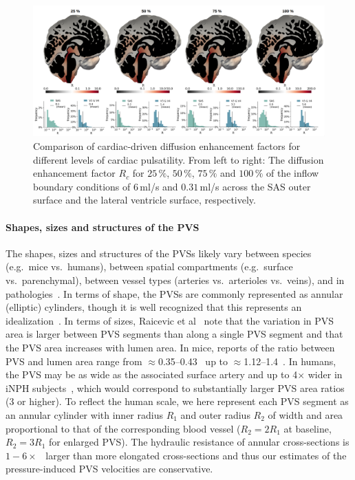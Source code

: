 \documentclass[fleqn,10pt]{wlscirep}
\begin{document}
\begin{figure}
    \centering
    \includegraphics[width=1.0\linewidth]{figures/cardiac_R_comparison.png}
    \caption{Comparison of cardiac-driven diffusion enhancement factors for different levels of cardiac pulsatility. From left to right: The diffusion enhancement factor $R_c$ for $25\,\%$, $50\,\%$, $75\,\%$ and $100\,\%$ of the inflow boundary conditions of $6\,$ml/s and $0.31\,$ml/s across the SAS outer surface and the lateral ventricle surface, respectively.}
    \label{fig:R_comparison}
\end{figure}

\paragraph{Shapes, sizes and structures of the PVS}
The shapes, sizes and structures of the PVSs likely vary between
species (e.g.~mice vs.~humans), between spatial compartments
(e.g.~surface vs.~parenchymal), between vessel types (arteries
vs.~arterioles vs.~veins), and in
pathologies~\cite{ichimura1991distribution, foley2012realtime,
  schain2017cortical, mestre2018flow, bedussi2018paravascular,
  mestre2022periarteriolar, smets2024perivascular, raicevic2023sizes,
  vinje2021brain, eide2024functional}. In terms of shape, the PVSs are
commonly represented as annular (elliptic) cylinders, though it is
well recognized that this represents an
idealization~\cite{mestre2018flow, tithof2019hydraulic,
  vinje2021brain, raicevic2023sizes, boster2024hydraulic,
  smets2024perivascular}. In terms of sizes, Raicevic et
al~\cite{raicevic2023sizes} note that the variation in PVS area is
larger between PVS segments than along a single PVS segment and that
the PVS area increases with lumen area. In mice, reports of the ratio
between PVS and lumen area range from
$\approx$0.35--0.43~\cite{smets2024perivascular} up to
$\approx$1.12--1.4~\cite{raicevic2023sizes, mestre2018flow}. In
humans, the PVS may be as wide as the associated surface artery and up
to 4$\times$ wider in iNPH subjects~\cite{eide2024functional}, which
would correspond to substantially larger PVS area ratios (3 or
higher). To reflect the human scale, we here represent each PVS
segment as an annular cylinder with inner radius $R_1$ and outer
radius $R_2$ of width and area proportional to that of the
corresponding blood vessel ($R_2 = 2 R_1$ at baseline, $R_2 = 3 R_1$
for enlarged PVS). The hydraulic resistance of annular cross-sections
is $1-6 \times$~\cite{tithof2019hydraulic} larger than more elongated
cross-sections and thus our estimates of the pressure-induced PVS
velocities are conservative.
\end{document}
